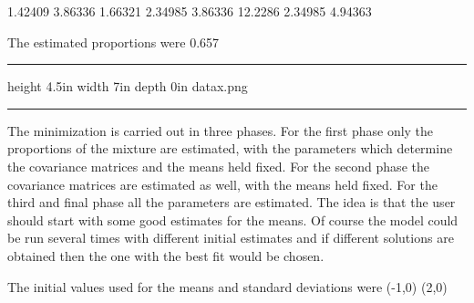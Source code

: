 {{{{{{{{  1.42409 3.86336    1.66321 2.34985
  3.86336 12.2286    2.34985 4.94363
\endexample

The estimated proportions were
  0.657
\endexample
\smallskip
\hrule
\smallskip
\pdfximage  height 4.5in width 7in depth 0in {datax.png}
\smallskip
\hrule
\smallskip

The minimization is carried out in three phases. For the first phase only
the proportions of the mixture are estimated, with the parameters which
determine the covariance matrices and the means held fixed. For the second
phase the covariance matrices are estimated as well, with the means held fixed.
For the third and final phase all the parameters are estimated.
The idea is that the user should start with some good estimates for
the means.  Of course the model could be run several times with different
initial estimates and if different solutions are obtained then the
one with the best fit would be chosen. 

The initial values used for the means and standard deviations were
\beginexample
  (-1,0)   (2,0)

}}}}}}}}
